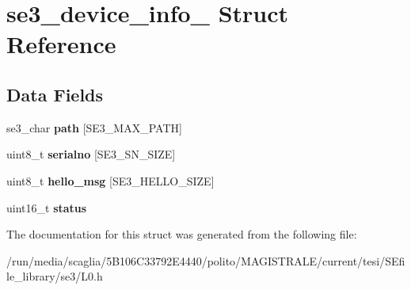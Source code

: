 \hypertarget{structse3__device__info__}{\section{se3\-\_\-device\-\_\-info\-\_\- Struct Reference}
\label{structse3__device__info__}
}
\subsection*{Data Fields}
\begin{DoxyCompactItemize}
\item 
\hypertarget{structse3__device__info___a7092b941574a64dceba10b2b89588d05}{se3\-\_\-char {\bfseries path} \mbox{[}S\-E3\-\_\-\-M\-A\-X\-\_\-\-P\-A\-T\-H\mbox{]}}\label{structse3__device__info___a7092b941574a64dceba10b2b89588d05}

\item 
\hypertarget{structse3__device__info___a9c9bfad5e10f46d13e8b5024fef49415}{uint8\-\_\-t {\bfseries serialno} \mbox{[}S\-E3\-\_\-\-S\-N\-\_\-\-S\-I\-Z\-E\mbox{]}}\label{structse3__device__info___a9c9bfad5e10f46d13e8b5024fef49415}

\item 
\hypertarget{structse3__device__info___a612c837c7faddcc7b368c4e7986bc0ce}{uint8\-\_\-t {\bfseries hello\-\_\-msg} \mbox{[}S\-E3\-\_\-\-H\-E\-L\-L\-O\-\_\-\-S\-I\-Z\-E\mbox{]}}\label{structse3__device__info___a612c837c7faddcc7b368c4e7986bc0ce}

\item 
\hypertarget{structse3__device__info___af3fa48c2b57a28d9f382b7cd371cf56f}{uint16\-\_\-t {\bfseries status}}\label{structse3__device__info___af3fa48c2b57a28d9f382b7cd371cf56f}

\end{DoxyCompactItemize}


The documentation for this struct was generated from the following file\-:\begin{DoxyCompactItemize}
\item 
/run/media/scaglia/5\-B106\-C33792\-E4440/polito/\-M\-A\-G\-I\-S\-T\-R\-A\-L\-E/current/tesi/\-S\-Efile\-\_\-library/se3/L0.\-h\end{DoxyCompactItemize}
